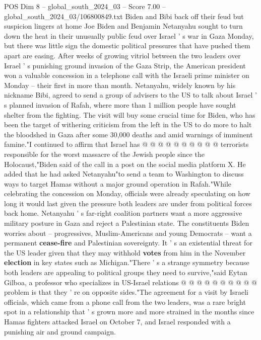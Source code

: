 \begin{textsample}{POS Dim 8 – global\_south\_2024\_03 – Score 7.00 – global\_south\_2024\_03/106800849.txt}  \label{ex:f8_pos_099}
Biden and Bibi back off their feud but suspicion lingers at home Joe Biden and Benjamin Netanyahu sought to turn down the heat in their unusually public feud over Israel ' s war in Gaza Monday, but there was little sign the domestic political pressures that have pushed them apart are easing.
After weeks of growing vitriol between the two leaders over Israel ' s punishing ground invasion of the Gaza Strip, the American president won a valuable concession in a telephone call with the Israeli prime minister on Monday -- their first in more than month.
Netanyahu, widely known by his nickname Bibi, agreed to send a group of advisers to the US to talk about Israel ' s planned invasion of Rafah, where more than 1 million people have sought shelter from the fighting.
The visit will buy some crucial time for Biden, who has been the target of withering criticism from the left in the US to do more to halt the bloodshed in Gaza after some 30,000 deaths and amid warnings of imminent famine."I continued to affirm that Israel has @ @ @ @ @ @ @ @ @ @ terrorists responsible for the worst massacre of the Jewish people since the Holocaust,"Biden said of the call in a post on the social media platform X.
He added that he had asked Netanyahu"to send a team to Washington to discuss ways to target Hamas without a major ground operation in Rafah."While celebrating the concession on Monday, officials were already speculating on how long it would last given the pressure both leaders are under from political forces back home.
Netanyahu ' s far-right coalition partners want a more aggressive military posture in Gaza and reject a Palestinian state.
The constituents Biden worries about -- progressives, Muslim-Americans and young Democrats -- want a permanent \textbf{cease-fire} and Palestinian sovereignty.
It ' s an existential threat for the US leader given that they may withhold \textbf{votes} from him in the November \textbf{election} in key states such as Michigan."There ' s a strange symmetry because both leaders are appealing to political groups they need to survive,"said Eytan Gilboa, a professor who specializes in US-Israel relations @ @ @ @ @ @ @ @ @ @ problem is that they ' re on opposite sides."The agreement for a visit by Israeli officials, which came from a phone call from the two leaders, was a rare bright spot in a relationship that ' s grown more and more strained in the months since Hamas fighters attacked Israel on October 7, and Israel responded with a punishing air and ground campaign.

\end{textsample}
